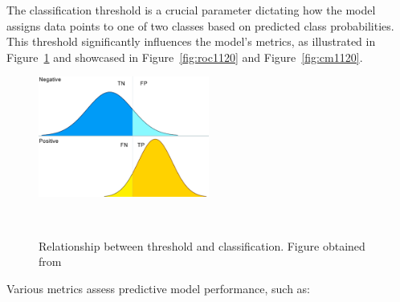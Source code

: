 The classification threshold is a crucial parameter dictating how the model assigns data points to one of two classes based on predicted class probabilities. This threshold significantly influences the model's metrics, as illustrated in Figure~\ref{fig:classification_threshold} and showcased in Figure~\ref{fig:roc1120} and Figure~\ref{fig:cm1120}.
\begin{figure}[h]
  \centering
  \includegraphics[width=0.5\textwidth]{figures/classification_threshold.png}
  \caption{Relationship between threshold and classification. Figure obtained from~\cite{wicklin2020}}
~\label{fig:classification_threshold}
\end{figure}

Various metrics assess predictive model performance, such as:

